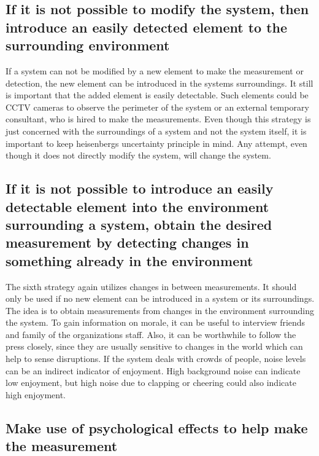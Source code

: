 \subsection[Add detectable element]{If it is not possible to modify the system, then introduce an easily detected element to the surrounding environment}

If a system can not be modified by a new element to make the measurement or detection, the new element can be introduced in the systems surroundings.
It still is important that the added element is easily detectable.
Such elements could be CCTV cameras to observe the perimeter of the system or an external temporary consultant, who is hired to make the measurements.
Even though this strategy is just concerned with the surroundings of a system and not the system itself, it is important to keep heisenbergs uncertainty principle in mind.
Any attempt, even though it does not directly modify the system, will change the system.


\subsection[Measure changes within system surroundings]{If it is not possible to introduce an easily detectable element into the environment surrounding a system, obtain the desired measurement by detecting changes in something already in the environment}

The sixth strategy again utilizes changes in between measurements.
It should only be used if no new element can be introduced in a system or its surroundings.
The idea is to obtain measurements from changes in the environment surrounding the system.
To gain information on morale, it can be useful to interview friends and family of the organizations staff.
Also, it can be worthwhile to follow the press closely, since they are usually sensitive to changes in the world which can help to sense disruptions.
If the system deals with crowds of people, noise levels can be an indirect indicator of enjoyment.
High background noise can indicate low enjoyment, but high noise due to clapping or cheering could also indicate high enjoyment.


\subsection[Psychological effects]{Make use of psychological effects to help make the measurement}

